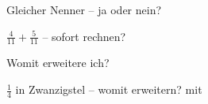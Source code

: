 \setcounter{aufgabe}{8}

\begin{aufgabe}{Gleicher Nenner – ja oder nein?}
\begin{teile}
\teil $\frac{4}{11} + \frac{5}{11}$ – sofort rechnen? \janein
\end{teile}
\end{aufgabe}

\begin{aufgabe}{Womit erweitere ich?}
\begin{teile}
\teil $\frac{1}{4}$ in Zwanzigstel – womit erweitern? mit \leerfeld
\end{teile}
\end{aufgabe}

